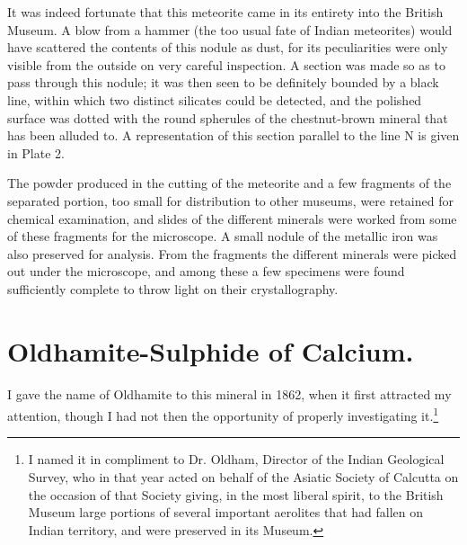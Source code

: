 \documentclass[a4paper, 12pt, oneside]{article}
\begin{document}
It was indeed fortunate that this meteorite came in its entirety into the British Museum. A blow from a hammer (the too usual fate of Indian meteorites) would have scattered the contents of this nodule as dust, for its peculiarities were only visible from the outside on very careful inspection. A section was made so as to pass through this nodule; it was then seen to be definitely bounded by a black line, within which two distinct silicates could be detected, and the polished surface was dotted with the round spherules of the chestnut-brown mineral that has been alluded to. A representation of this section parallel to the line N is given in Plate 2.

The powder produced in the cutting of the meteorite and a few fragments of the separated portion, too small for distribution to other museums, were retained for chemical examination, and slides of the different minerals were worked from some of these fragments for the microscope. A small nodule of the metallic iron was also preserved for analysis. From the fragments the different minerals were picked out under the microscope, and among these a few specimens were found sufficiently complete to throw light on their crystallography.
\clearpage
\section{Oldhamite-Sulphide of Calcium.}
\paragraph{}
I gave the name of Oldhamite to this mineral in 1862, when it first attracted my attention, though I had not then the opportunity of properly investigating it.\footnote{I named it in compliment to Dr. Oldham, Director of the Indian Geological Survey, who in that year acted on behalf of the Asiatic Society of Calcutta on the occasion of that Society giving, in the most liberal spirit, to the British Museum large portions of several important aerolites that had fallen on Indian territory, and were preserved in its Museum.}
\end{document}
